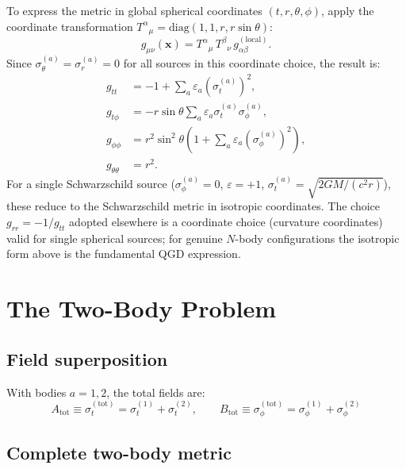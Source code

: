 \documentclass[11pt,a4paper]{article}
\theoremstyle{plain}
\theoremstyle{definition}
\theoremstyle{remark}
\newcommand{\boldx}{\mathbf{x}}
\newcommand{\sig}[2]{\sigma_{#1}^{(#2)}}
\begin{document}
To express the metric in global spherical coordinates $(t,r,\theta,\phi)$, apply the coordinate transformation $T^\alpha{}_\mu = \mathrm{diag}(1,1,r,r\sin\theta)$:
\begin{equation}
  g_{\mu\nu}(\boldx) = T^\alpha{}_\mu\, T^\beta{}_\nu\, g_{\alpha\beta}^{(\mathrm{local})}.
\end{equation}
Since $\sig{\theta}{a} = \sig{r}{a} = 0$ for all sources in this coordinate choice, the result is:
\begin{align}
  g_{tt} &= -1 + \sum_a \varepsilon_a \left(\sig{t}{a}\right)^2, \label{eq:gtt_master}\\
  g_{t\phi} &= -r\sin\theta \sum_a \varepsilon_a \sig{t}{a}\sig{\phi}{a}, \label{eq:gtphi_master}\\
  g_{\phi\phi} &= r^2\sin^2\theta\left(1 + \sum_a \varepsilon_a \left(\sig{\phi}{a}\right)^2\right), \label{eq:gphiphi_master}\\
  g_{\theta\theta} &= r^2. \label{eq:gthth_master}
\end{align}
For a single Schwarzschild source ($\sig{\phi}{a}=0$, $\varepsilon=+1$, $\sig{t}{a}=\sqrt{2GM/(c^2r)}$), these reduce to the Schwarzschild metric in isotropic coordinates. The choice $g_{rr} = -1/g_{tt}$ adopted elsewhere is a coordinate choice (curvature coordinates) valid for single spherical sources; for genuine $N$-body configurations the isotropic form above is the fundamental QGD expression.

\section{The Two-Body Problem}
\label{sec:two_body}

\subsection{Field superposition}

With bodies $a = 1,2$, the total fields are:
\begin{equation}
  A_{\mathrm{tot}} \equiv \sig{t}{\mathrm{tot}} = \sig{t}{1} + \sig{t}{2}, \qquad B_{\mathrm{tot}} \equiv \sig{\phi}{\mathrm{tot}} = \sig{\phi}{1} + \sig{\phi}{2}
\end{equation}

\subsection{Complete two-body metric}
\end{document}
